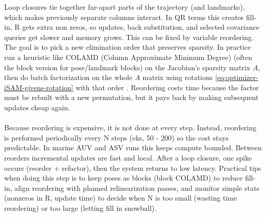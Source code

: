 \noindent
Loop closures tie together far-apart parts of the trajectory (and landmarks), which makes previously separate columns interact. In QR terms this creates fill-in, R gets extra non zeros, so updates, back substitution, and selected covariance queries get slower and memory grows. This can be fixed by variable reordering. The goal is to pick a new elimination order that preserves sparsity. In practice run a heuristic like COLAMD (Column Approximate Minimum Degree) (often the block version for pose/landmark blocks) on the Jacobian's sparsity matrix $A$, then do batch factorization on the whole $A$ matrix using rotations \eqref{eq:optimizer-iSAM-givens-rotation} with that order \cite{iSAM_paper}. Reordering costs time because the factor must be rebuilt with a new permutation, but it pays back by making subsequent updates cheap again.
\\ \\
Because reordering is expensive, it is not done at every step. Instead, reordering is performed periodically every N steps (eks, 50 - 200) so the cost stays predictable. In marine AUV and ASV runs this keeps compute bounded. Between reorders incremental updates are fast and local. After a loop closure, one spike occurs (reorder + refactor), then the system returns to low latency. Practical tips when doing this step is to keep poses as blocks (block COLAMD) to reduce fill-in, align reordering with planned relinearization passes, and monitor simple stats (nonzeros in R, update time) to decide when N is too small (wasting time reordering) or too large (letting fill in snowball).  




